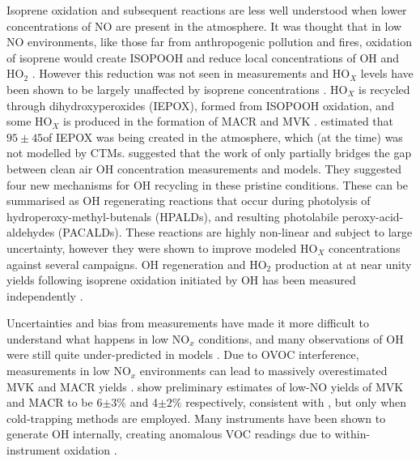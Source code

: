       Isoprene oxidation and subsequent reactions are less well understood when lower concentrations of NO are present in the atmosphere.
      It was thought that in low NO environments, like those far from anthropogenic pollution and fires, oxidation of isoprene would create ISOPOOH and reduce local concentrations of OH and HO$_2$ \parencite{Guenther2000,Paulot2009b}.
      However this reduction was not seen in measurements and HO$_X$ levels have been shown to be largely unaffected by isoprene concentrations \parencite{Paulot2009b}.
      HO$_X$ is recycled through dihydroxyperoxides (IEPOX), formed from ISOPOOH oxidation, and some HO$_X$ is produced in the formation of MACR and MVK \parencite{Paulot2009b}.
      \textcite{Paulot2009b} estimated that $95 \pm 45$\tgpyr of IEPOX was being created in the atmosphere, which (at the time) was not modelled by CTMs.
      \textcite{Peeters2010} suggested that the work of \textcite{Paulot2009b} only partially bridges the gap between clean air OH concentration measurements and models.
      They suggested four new mechanisms for OH recycling in these pristine conditions.
      These can be summarised as OH regenerating reactions that occur during photolysis of hydroperoxy-methyl-butenals (HPALDs), and resulting photolabile peroxy-acid-aldehydes (PACALDs).
      These reactions are highly non-linear and subject to large uncertainty, however they were shown to improve modeled HO$_X$ concentrations against several campaigns.
      OH regeneration and HO$_2$ production at at near unity yields following isoprene oxidation initiated by OH has been measured independently \parencite{Peeters2010, Crounse2012}.
      
      
      Uncertainties and bias from measurements have made it more difficult to understand what happens in low NO$_x$ conditions, and many observations of OH were still quite under-predicted in models \parencite{Mao2012}.
      Due to OVOC interference, measurements in low NO$_x$ environments can lead to massively overestimated MVK and MACR yields \parencite{Nguyen2014}.
      \textcite{Nguyen2014} show preliminary estimates of low-NO yields of MVK and MACR to be 6$\pm3\%$ and 4$\pm2\%$ respectively, consistent with \textcite{Liu2013}, but only when cold-trapping methods are employed.
      Many instruments have been shown to generate OH internally, creating anomalous VOC readings due to within-instrument oxidation \parencite{Mao2012}.
      
